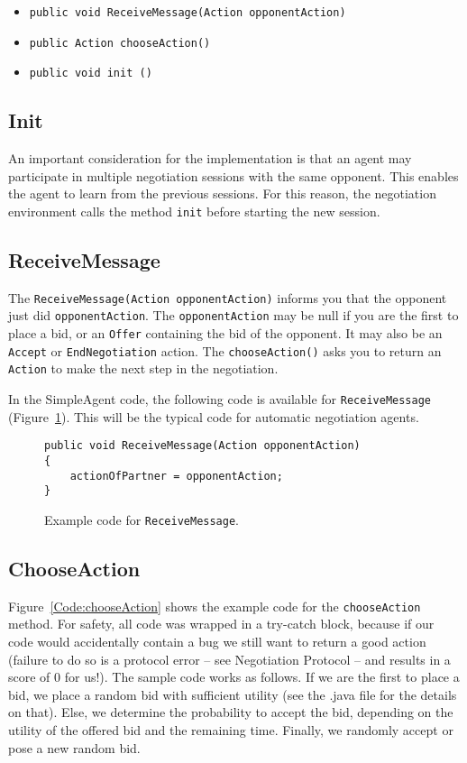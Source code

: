 \documentclass[]{article}
\begin{document}
\begin{itemize}
	\item \texttt{public void ReceiveMessage(Action opponentAction)}
	\item \texttt{public Action chooseAction()}
	\item \texttt{public void init ()}
\end{itemize}

\subsection{Init}
An important consideration for the implementation is that an agent may participate in multiple negotiation sessions with the same opponent. This enables the agent to learn from the previous sessions. For this reason, the negotiation environment calls the method \texttt{init} before starting the new session. 


\subsection{ReceiveMessage}
The \texttt{ReceiveMessage(Action opponentAction)} informs you that the opponent just did \texttt{opponentAction}. The \texttt{opponentAction} may be null if you are the first to place a bid, or an \texttt{Offer} containing the bid of the opponent. It may also be an \texttt{Accept} or \texttt{EndNegotiation} action.
The \texttt{chooseAction()} asks you to return an \texttt{Action} to make the next step in the negotiation.

In the SimpleAgent code, the following code is available for \texttt{ReceiveMessage} (Figure~\ref{Code:ReceiveMessage}). This will be the typical code for automatic negotiation agents.

\begin{figure}
\begin{lstlisting}
public void ReceiveMessage(Action opponentAction) 
{
	actionOfPartner = opponentAction;
}
\end{lstlisting}
\caption{Example code for \texttt{ReceiveMessage}.}\label{Code:ReceiveMessage}
\end{figure}

\subsection{ChooseAction}
Figure~\ref{Code:chooseAction} shows the example code for the \texttt{chooseAction} method. For safety, all code was wrapped in a try-catch block, because if our code would accidentally contain a bug we still want to return a good action (failure to do so is a protocol error – see Negotiation Protocol – and results in a score of 0 for us!).
The sample code works as follows. If we are the first to place a bid, we place a random bid with sufficient utility (see the .java file for the details on that). Else, we determine the probability to accept the bid, depending on the utility of the offered bid and the remaining time. Finally, we randomly accept or pose a new random bid.
\end{document}

